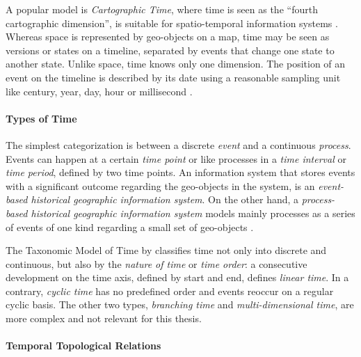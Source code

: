 A popular model is \emph{Cartographic Time}, where time is seen as the ``fourth cartographic dimension'', is suitable for spatio-temporal information systems
\cite[p. 28]{Langran1989timeingis}.
Whereas space is represented by geo-objects on a map, time may be seen as versions or states on a timeline, separated by events that change one state to another state.
Unlike space, time knows only one dimension.
The position of an event on the timeline is described by its date using a reasonable sampling unit like century, year, day, hour or millisecond
\cite[p. 32]{Langran1989timeingis}.

\paragraph{Types of Time} %
\label{par:types_of_time}

The simplest categorization is between a discrete \emph{event} and a continuous \emph{process}. Events can happen at a certain \emph{time point} or like processes in a \emph{time interval} or \emph{time period}, defined by two time points. An information system that stores events with a significant outcome regarding the geo-objects in the system, is an \emph{event-based historical geographic information system}. On the other hand, a \emph{process-based historical geographic information system} models mainly processes as a series of events of one kind regarding a small set of geo-objects
\cite[chapter 2, pp. 47-49]{solana2014spatio}.

The Taxonomic Model of Time by
\cite{frank98typesoftime}
classifies time not only into discrete and continuous, but also by the \emph{nature of time} or \emph{time order}: a consecutive development on the time axis, defined by start and end, defines \emph{linear time}. In a contrary, \emph{cyclic time} has no predefined order and events reoccur on a regular cyclic basis. The other two types, \emph{branching time} and \emph{multi-dimensional time}, are more complex and not relevant for this thesis.


\paragraph{Temporal Topological Relations} %
\label{par:temporal_relations}

